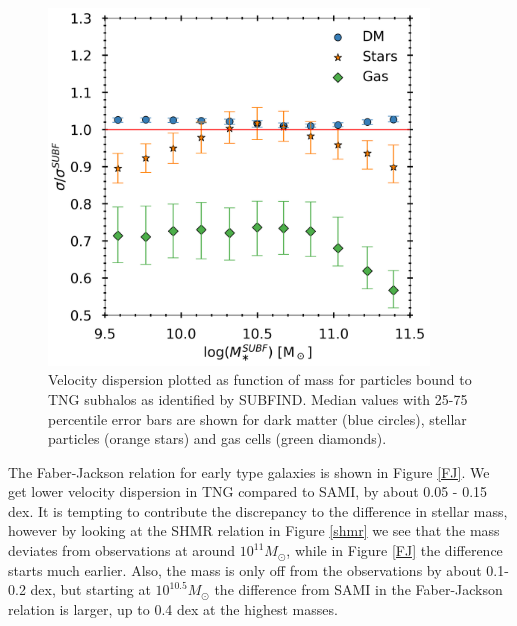 \begin{figure}
    \centering
    \includegraphics[width=0.9\textwidth]{images/VD_particles.png}
    \caption{Velocity dispersion plotted as function of mass for particles bound to TNG subhalos as identified by SUBFIND. Median values with 25-75 percentile error bars are shown for dark matter (blue circles), stellar particles (orange stars) and gas cells (green diamonds).}
    \label{VD_part}
\end{figure}

The Faber-Jackson relation for early type galaxies is shown in Figure \ref{FJ}. We get lower velocity dispersion in TNG compared to SAMI, by about 0.05 - 0.15 dex. It is tempting to contribute the discrepancy to the difference in stellar mass, however by looking at the SHMR relation in Figure \ref{shmr} we see that the mass deviates from observations at around $10^{11} M_{\odot}$, while in Figure \ref{FJ} the difference starts much earlier. Also, the mass is only off from the observations by about 0.1-0.2 dex, but starting at $10^{10.5} M_{\odot}$ the difference from SAMI in the Faber-Jackson relation is larger, up to 0.4 dex at the highest masses.


